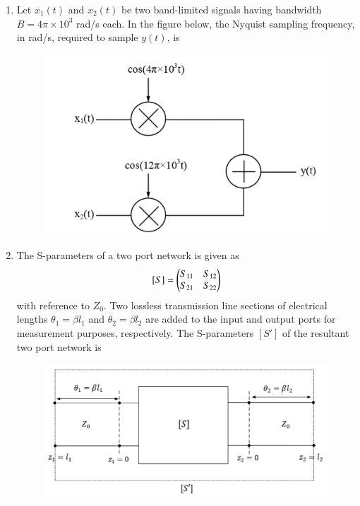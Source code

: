 \documentclass[a4paper, 11pt]{article}
\begin{document}
\begin{enumerate}
    \item Let $x_1(t)$ and $x_2(t)$ be two band-limited signals having bandwidth $B = 4\pi \times 10^3$ rad/s each. In the figure below, the Nyquist sampling frequency, in rad/s, required to sample $y(t)$, is
    \begin{figure}[H]
        \centering
        \includegraphics[width=0.7\columnwidth]{figs/Q40.png}
        \caption*{}
        \label{fig:q50}
    \end{figure}
    \begin{enumerate}
    \end{enumerate}
    
    \hfill{}
    
    \item The S-parameters of a two port network is given as
    \[ [S] = \begin{pmatrix}S_{11} & S_{12} \\ S_{21} & S_{22}\end{pmatrix} \]
    with reference to $Z_0$. Two lossless transmission line sections of electrical lengths $\theta_1 = \beta l_1$ and $\theta_2 = \beta l_2$ are added to the input and output ports for measurement purposes, respectively. The S-parameters $[S']$ of the resultant two port network is
    \begin{figure}[H]
        \centering
        \includegraphics[width=0.8\columnwidth]{figs/Q41.png}
        \caption*{}
        \label{fig:q51}
    \end{figure}
    

\end{enumerate}
\end{document}
